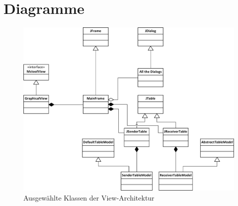\chapter{Diagramme}


        
        \begin{figure}
            \includegraphics[width=15cm]{images/view_architecture.png}
            \centering
            \caption{Ausgewählte Klassen der View-Architektur}
            \label{view_architecture}
        \end{figure}